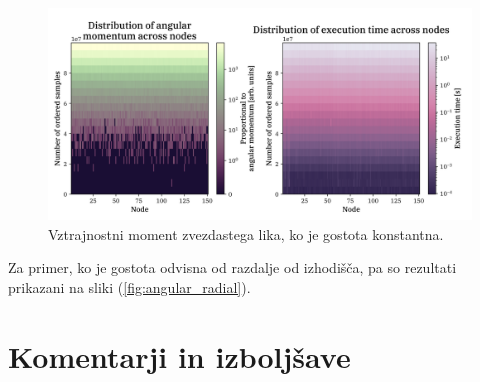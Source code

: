 \documentclass[a4paper]{article}
\begin{document}
\begin{figure}[H]
    \centering
    \includegraphics[width=\textwidth]{../StarShapes/Images/angular_const_heatmaps.png}
    \caption{Vztrajnostni moment zvezdastega lika, ko je gostota konstantna.}
    \label{fig:angular_const_heatmaps}
\end{figure}

Za primer, ko je gostota odvisna od razdalje od izhodišča, pa so rezultati prikazani na sliki (\ref{fig:angular_radial}).



\section{Komentarji in izboljšave}

\newpage


\end{document}
